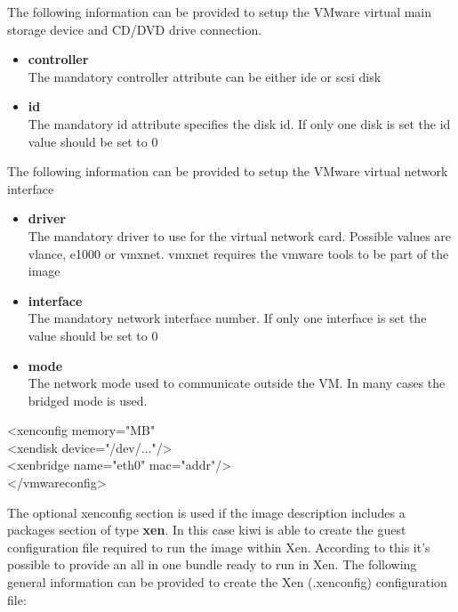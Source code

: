 The following information can be provided to setup the VMware virtual
main storage device and CD/DVD drive connection.

\begin{itemize}
\item \textbf{controller}\\
      The mandatory controller attribute can be either ide or scsi disk
\item \textbf{id}\\
      The mandatory id attribute specifies the disk id. If only one
      disk is set the id value should be set to 0 
\end{itemize}

The following information can be provided to setup the VMware virtual
network interface

\begin{itemize}
\item \textbf{driver}\\
      The mandatory driver to use for the virtual network card. Possible
      values are vlance, e1000 or vmxnet. vmxnet requires the vmware tools to be
      part of the image
\item \textbf{interface}\\
      The mandatory network interface number. If only one interface is
      set the value should be set to 0
\item \textbf{mode}\\
      The network mode used to communicate outside the VM. In many cases
      the bridged mode is used.
\end{itemize}

\begin{Command}{12cm}
<xenconfig memory="MB"\\
\hspace*{1cm}<xendisk device="/dev/..."/>\\
\hspace*{1cm}<xenbridge name="eth0" mac="addr"/>\\
</vmwareconfig>
\end{Command}

The optional xenconfig section is used if the image description
includes a packages section of type \textbf{xen}. In this case kiwi
is able to create the guest configuration file required to run the
image within Xen. According to this it's possible to provide an all
in one bundle ready to run in Xen. The following general information
can be provided to create the Xen (.xenconfig) configuration file:

